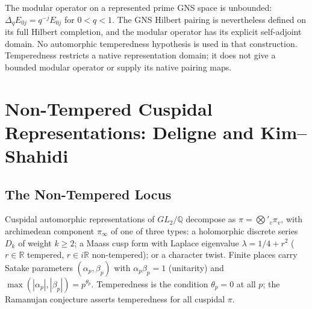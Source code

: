 \begin{remark}
\label{v4-arith:w5-c:rem:baseline}
The modular operator on a represented prime GNS space is
unbounded: $\Delta_qE_{0j}=q^{-j}E_{0j}$ for $0<q<1$.
The GNS Hilbert pairing is nevertheless defined on its full
Hilbert completion, and the modular operator has its explicit
self-adjoint domain. No automorphic temperedness hypothesis is
used in that construction. Temperedness restricts a native
representation domain; it does not give a bounded modular
operator or supply its native pairing maps.
\end{remark}

\section{Non-Tempered Cuspidal Representations: Deligne and Kim--Shahidi}
\label{v4-arith:w5-c:non-tempered}

\subsection{The Non-Tempered Locus}
\label{v4-arith:w5-c:non-tempered:locus}

Cuspidal automorphic representations of \(GL_{2}/\mathbb{Q}\) decompose
as \(\pi=\bigotimes'_{v}\pi_{v}\), with archimedean component \(\pi_{\infty}\)
of one of three types: a holomorphic discrete series \(D_{k}\) of
weight \(k\geq 2\); a Maass cusp form with Laplace eigenvalue
\(\lambda=1/4+r^{2}\) (\(r\in\mathbb{R}\) tempered, \(r\in i\mathbb{R}\)
non-tempered); or a character twist. Finite places carry Satake
parameters \((\alpha_{p},\beta_{p})\) with \(\alpha_{p}\beta_{p}=1\)
(unitarity) and \(\max(|\alpha_{p}|,|\beta_{p}|)=p^{\theta_{p}}\).
Temperedness is the condition \(\theta_{p}=0\) at all \(p\); the
Ramanujan conjecture asserts temperedness for all cuspidal \(\pi\).


